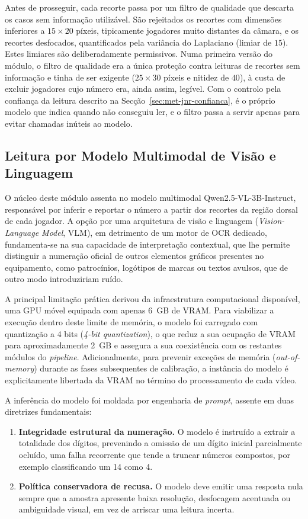 Antes de prosseguir, cada recorte passa por um filtro de qualidade que descarta os casos sem
informação utilizável. São rejeitados os recortes com dimensões inferiores a $15\times20$ píxeis,
tipicamente jogadores muito distantes da câmara, e os recortes desfocados, quantificados pela
variância do Laplaciano (limiar de $15$). Estes limiares são deliberadamente permissivos. Numa
primeira versão do módulo, o filtro de qualidade era a única proteção contra leituras de recortes
sem informação e tinha de ser exigente ($25\times30$ píxeis e nitidez de $40$), à custa de excluir
jogadores cujo número era, ainda assim, legível. Com o controlo pela confiança da leitura descrito
na Secção~\ref{sec:met-jnr-confianca}, é o próprio modelo que indica quando não conseguiu ler, e o
filtro passa a servir apenas para evitar chamadas inúteis ao modelo.

\subsection{Leitura por Modelo Multimodal de Visão e Linguagem}

O núcleo deste módulo assenta no modelo multimodal Qwen2.5-VL-3B-Instruct, responsável por
inferir e reportar o número a partir dos recortes da região dorsal de cada jogador. A opção por
uma arquitetura de visão e linguagem (\emph{Vision-Language Model}, VLM), em detrimento de um
motor de OCR dedicado, fundamenta-se na sua capacidade de interpretação contextual, que lhe
permite distinguir a numeração oficial de outros elementos gráficos presentes no equipamento,
como patrocínios, logótipos de marcas ou textos avulsos, que de outro modo introduziriam ruído.

A principal limitação prática derivou da infraestrutura computacional disponível, uma GPU móvel
equipada com apenas 6~GB de VRAM. Para viabilizar a execução dentro deste limite de memória, o
modelo foi carregado com quantização a 4 bits (\emph{4-bit quantization}), o que reduz a sua
ocupação de VRAM para aproximadamente 2~GB e assegura a sua coexistência com os restantes
módulos do \emph{pipeline}. Adicionalmente, para prevenir exceções de memória (\emph{out-of-memory})
durante as fases subsequentes de calibração, a instância do modelo é explicitamente libertada da
VRAM no término do processamento de cada vídeo.

A inferência do modelo foi moldada por engenharia de \emph{prompt}, assente em duas diretrizes
fundamentais:

\begin{enumerate}
    \item \textbf{Integridade estrutural da numeração.} O modelo é instruído a extrair a
    totalidade dos dígitos, prevenindo a omissão de um dígito inicial parcialmente ocluído, uma
    falha recorrente que tende a truncar números compostos, por exemplo classificando um 14 como
    4.
    \item \textbf{Política conservadora de recusa.} O modelo deve emitir uma resposta nula
    sempre que a amostra apresente baixa resolução, desfocagem acentuada ou ambiguidade visual,
    em vez de arriscar uma leitura incerta.
\end{enumerate}

